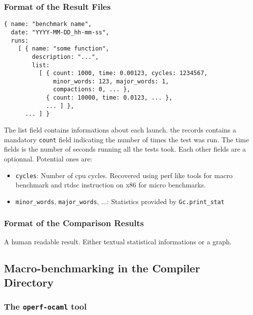 \documentclass[11pt,a4paper]{article}
\begin{document}
\subsubsection{Format of the Result Files}\label{result-format}

\begin{verbatim}
{ name: "benchmark name",
  date: "YYYY-MM-DD_hh-mm-ss",
  runs:
    [ { name: "some function",
        description: "...",
        list:
          [ { count: 1000, time: 0.00123, cycles: 1234567,
              minor_words: 123, major_words: 1,
              compactions: 0, ... },
            { count: 10000, time: 0.0123, ... },
            ... ] },
      ... ] }
\end{verbatim}

The list field contains informations about each launch. the records
contains a mandatory {\tt count} field indicating the number of times
the test was run. The time fields is the number of seconds running all
the tests took. Each other fields are a optionnal. Potential ones are:
\begin{itemize}
\item {\tt cycles}: Number of cpu cycles. Recovered using perf like
  tools for macro benchmark and rtdsc instruction on x86 for micro
  benchmarks.
\item {\tt minor\_words}, {\tt major\_words}, ...: Statistics provided
  by {\tt Gc.print\_stat}
\end{itemize}

\subsubsection{Format of the Comparison Results}

A human readable result. Either textual statistical informations or a graph.
~\vspace{4cm}~
\subsection{Macro-benchmarking in the Compiler Directory}

\subsubsection{The {\tt operf-ocaml} tool}
\end{document}
